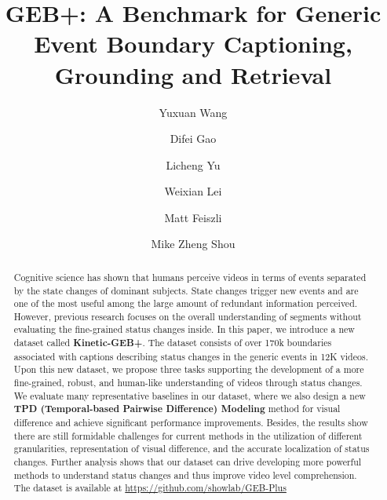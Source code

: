 \documentclass[runningheads]{llncs}
\begin{document}
\pagestyle{headings}
\mainmatter
\def\ECCVSubNumber{1214}  

\title{GEB+: A Benchmark for Generic Event Boundary Captioning, Grounding and Retrieval} 

\begin{comment}
\titlerunning{ECCV-22 submission ID \ECCVSubNumber} 
\authorrunning{ECCV-22 submission ID \ECCVSubNumber} 
\author{Anonymous ECCV submission}
\institute{Paper ID \ECCVSubNumber}
\end{comment}


\author{Yuxuan Wang \and
Difei Gao \and
Licheng Yu \and
Weixian Lei \and
Matt Feiszli \and
Mike Zheng Shou}
\maketitle

\begin{abstract}
Cognitive science has shown that humans perceive videos in terms of events separated by the state changes of dominant subjects. State changes trigger new events and are one of the most useful among the large amount of redundant information perceived. However, previous research focuses on the overall understanding of segments without evaluating the fine-grained status changes inside.
In this paper, we introduce a new dataset called \textbf{Kinetic-GEB+}. The dataset consists of over 170k boundaries associated with captions describing status changes in the generic events in 12K videos. Upon this new dataset, we propose three tasks supporting the development of a more fine-grained, robust, and human-like understanding of videos through status changes. 
We evaluate many representative baselines in our dataset, where we also design a new \textbf{TPD (Temporal-based Pairwise Difference) Modeling} method for visual difference and achieve significant performance improvements. Besides, the results show there are still formidable challenges for current methods in the utilization of different granularities, representation of visual difference, and the accurate localization of status changes. Further analysis shows that our dataset can drive developing more powerful methods to understand status changes and thus improve video level comprehension. The dataset is available at
\href{https://github.com/showlab/GEB-Plus}{https://github.com/showlab/GEB-Plus}


\end{abstract}
\end{document}
